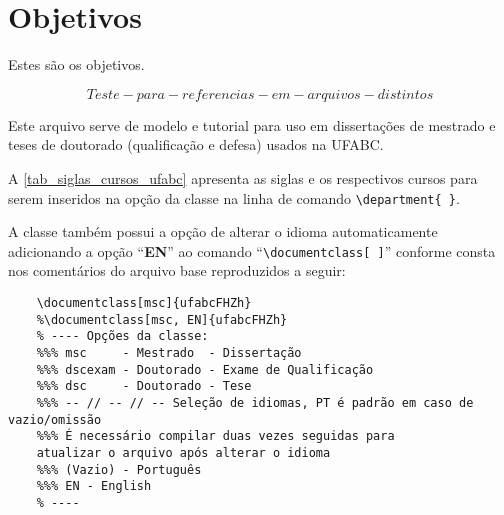 


\chapter{Objetivos}
\label{cap_objetivos}

Estes são os objetivos.

\begin{equation} \label{obj_eq_teste}
	Teste-para-referencias-em-arquivos-distintos
\end{equation}

Este arquivo serve de modelo e tutorial para uso em dissertações de mestrado e teses de doutorado (qualificação e defesa) usados na UFABC.

A \autoref{tab_siglas_cursos_ufabc} apresenta as siglas e os respectivos cursos para serem inseridos na opção da classe
{\ufabcFHZ}
na linha de comando
\verb|\department{ }|.

A classe
{\ufabcFHZ}
também possui a opção de alterar o idioma automaticamente adicionando a opção
``\textbf{EN}''
ao comando
``\verb|\documentclass[ ]|''
conforme consta nos comentários do arquivo base reproduzidos a seguir:

\begin{verbatim}
	\documentclass[msc]{ufabcFHZh}
	%\documentclass[msc, EN]{ufabcFHZh}
	% ---- Opções da classe:
	%%% msc 	- Mestrado  - Dissertação
	%%% dscexam	- Doutorado - Exame de Qualificação
	%%% dsc 	- Doutorado - Tese
	%%% -- // -- // -- Seleção de idiomas, PT é padrão em caso de vazio/omissão
	%%% É necessário compilar duas vezes seguidas para 
	atualizar o arquivo após alterar o idioma
	%%% (Vazio) - Português
	%%% EN - English
	% ----
\end{verbatim}

